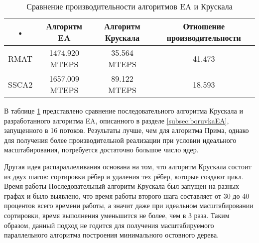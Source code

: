 \documentclass[a4paper,12pt]{extarticle}
\begin{document}
\begin{table}
    \caption{Сравнение производительности алгоритмов EA и Крускала}
    \label{tabel:kruskalSeq}
    \begin{center}
        \begin{tabular}{|c|c|c|c|}
            \hline 
            \rule[-1ex]{0pt}{2.5ex} • & Алгоритм EA & Алгоритм Крускала & Отношение производительности \\ 
            \hline 
            \rule[-1ex]{0pt}{2.5ex} RMAT & 1474.920 MTEPS & 35.564 MTEPS & 41.473 \\ 
            \hline 
            \rule[-1ex]{0pt}{2.5ex} SSCA2 & 1657.009 MTEPS & 89.122 MTEPS & 18.593 \\ 
            \hline 
        \end{tabular}
    \end{center}
\end{table} 

В таблице \ref{tabel:kruskalSeq} представлено сравнение последовательного алгоритма Крускала и разработанного алгоритма EA, описанного в разделе \ref{subsec:boruvkaEA}, запущенного в 16 потоков.
Результаты лучше, чем для алгоритма Прима, однако для получения более производительной реализации при условии идеального масштабирования, потребуется достаточно большое число ядер.

Другая идея распараллеливания основана на том, что алгоритм Крускала состоит из двух шагов: сортировки рёбер и удаления тех рёбер, которые создают цикл. 
Время работы 
Последовательный алгоритм Крускала был запущен на разных графах и было выявлено, что время работы второго шага составляет от 30 до 40 процентов всего времени работы, а значит даже при идеальном масштабировании сортировки, время выполнения уменьшится не более, чем в 3 раза.
Таким образом, данный подход не годится для получения масштабируемого параллельного алгоритма построения минимального остовного дерева.




\end{document}
